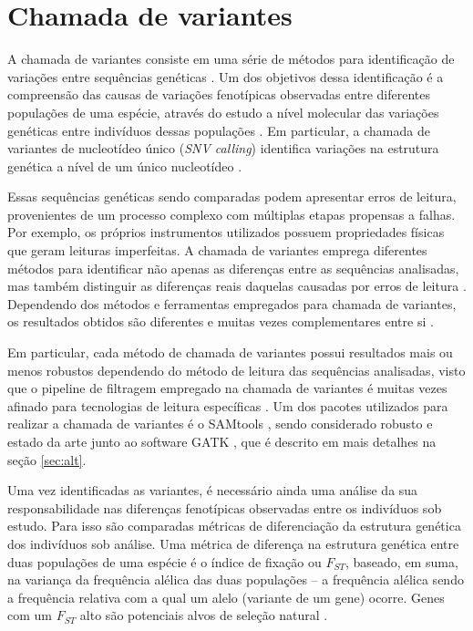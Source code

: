 \documentclass[cic,tc]{iiufrgs}
\begin{document}
\section{Chamada de variantes}
\label{sec:call}

A chamada de variantes consiste em uma série de métodos para identificação de
variações entre sequências genéticas \cite{nielsen2011genotype}. Um dos
objetivos dessa identificação é a compreensão das causas de variações
fenotípicas observadas entre diferentes populações de uma espécie, através do
estudo a nível molecular das variações genéticas entre indivíduos dessas
populações \cite{jiang2019population}. Em particular, a chamada de variantes de
nucleotídeo único (\textit{SNV calling}) identifica variações na estrutura
genética a nível de um único nucleotídeo \cite{khurana2016role}.

Essas sequências genéticas sendo comparadas podem apresentar erros de leitura,
provenientes de um processo complexo com múltiplas etapas propensas a falhas.
Por exemplo, os próprios instrumentos utilizados possuem propriedades físicas
que geram leituras imperfeitas. A chamada de variantes emprega diferentes
métodos para identificar não apenas as diferenças entre as sequências
analisadas, mas também distinguir as diferenças reais daquelas causadas por
erros de leitura \cite{poplin2018universal}. Dependendo dos métodos e
ferramentas empregados para chamada de variantes, os resultados obtidos são
diferentes e muitas vezes complementares entre
si \cite{hwang2015systematic} \cite{gezsi2015variantmetacaller} \cite{guo2015seqmule}.

Em particular, cada método de chamada de variantes possui resultados mais ou
menos robustos dependendo do método de leitura das sequências analisadas, visto
que o pipeline de filtragem empregado na chamada de variantes é muitas vezes
afinado para tecnologias de leitura específicas \cite{poplin2018universal}. Um
dos pacotes utilizados para realizar a chamada de variantes é o
SAMtools \cite{pirooznia2014validation}, sendo considerado robusto e estado da
arte junto ao software
GATK \cite{crysnanto2019accurate} \cite{hwang2015systematic}
\cite{yao2020evaluation} \cite{poplin2018universal}, que é descrito em mais
detalhes na seção \ref{sec:alt}.

Uma vez identificadas as variantes, é necessário ainda uma análise da sua
responsabilidade nas diferenças fenotípicas observadas entre os indivíduos sob
estudo. Para isso são comparadas métricas de diferenciação da estrutura
genética dos indivíduos sob análise. Uma métrica de diferença na estrutura
genética entre duas populações de uma espécie é o índice de fixação ou
$F_{ST}$, baseado, em suma, na variança da frequência alélica das duas
populações -- a frequência alélica sendo a frequência relativa com a qual um
alelo (variante de um gene) ocorre. Genes com um $F_{ST}$ alto são potenciais
alvos de seleção natural \cite{yi2010sequencing}.
\end{document}
